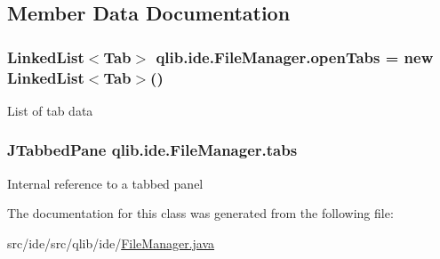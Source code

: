 \subsection{Member Data Documentation}
\subsubsection[{\texorpdfstring{open\+Tabs}{openTabs}}]{\setlength{\rightskip}{0pt plus 5cm}Linked\+List$<${\bf Tab}$>$ qlib.\+ide.\+File\+Manager.\+open\+Tabs = new Linked\+List$<${\bf Tab}$>$()\hspace{0.3cm}{\ttfamily [private]}}\hypertarget{classqlib_1_1ide_1_1FileManager_af28dcef61bad9a512d4dfba62d9288a3}{}\label{classqlib_1_1ide_1_1FileManager_af28dcef61bad9a512d4dfba62d9288a3}
List of tab data 
\subsubsection[{\texorpdfstring{tabs}{tabs}}]{\setlength{\rightskip}{0pt plus 5cm}J\+Tabbed\+Pane qlib.\+ide.\+File\+Manager.\+tabs\hspace{0.3cm}{\ttfamily [private]}}\hypertarget{classqlib_1_1ide_1_1FileManager_ad30cb7a3ba1310ab8cb38f11bb84f0c1}{}\label{classqlib_1_1ide_1_1FileManager_ad30cb7a3ba1310ab8cb38f11bb84f0c1}
Internal reference to a tabbed panel 

The documentation for this class was generated from the following file\+:\begin{DoxyCompactItemize}
\item 
src/ide/src/qlib/ide/\hyperlink{FileManager_8java}{File\+Manager.\+java}\end{DoxyCompactItemize}
